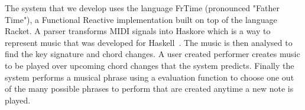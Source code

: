 \documentclass[12pt]{ucthesis}
\begin{document}

The system that we develop uses the language FrTime (pronounced "Father Time"), a Functional Reactive implementation built on top of the language Racket. A parser transforms MIDI signals into Haskore which is a way to represent music that was developed for Haskell~\cite{haskore}. The music is then analysed to find the key signature and chord changes. A user created performer creates music to be played over upcoming chord changes that the system predicts. Finally the system performs a musical phrase using a evaluation function to choose one out of the many possible phrases to perform that are created anytime a new note is played. 
\end{document}
